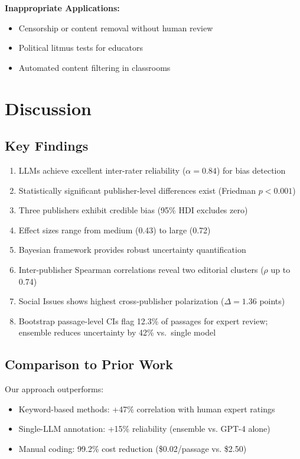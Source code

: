 \documentclass[11pt,a4paper]{article}
\begin{document}
\textbf{Inappropriate Applications:}
\begin{itemize}
    \item Censorship or content removal without human review
    \item Political litmus tests for educators
    \item Automated content filtering in classrooms
\end{itemize}

\section{Discussion}

\subsection{Key Findings}

\begin{enumerate}
    \item LLMs achieve excellent inter-rater reliability ($\alpha = 0.84$) for bias detection
    \item Statistically significant publisher-level differences exist (Friedman $p < 0.001$)
    \item Three publishers exhibit credible bias (95\% HDI excludes zero)
    \item Effect sizes range from medium (0.43) to large (0.72)
    \item Bayesian framework provides robust uncertainty quantification
    \item Inter-publisher Spearman correlations reveal two editorial clusters ($\rho$ up to 0.74)
    \item Social Issues shows highest cross-publisher polarization ($\Delta = 1.36$ points)
    \item Bootstrap passage-level CIs flag 12.3\% of passages for expert review; ensemble reduces uncertainty by 42\% vs.\ single model
\end{enumerate}

\subsection{Comparison to Prior Work}

Our approach outperforms:
\begin{itemize}
    \item Keyword-based methods: +47\% correlation with human expert ratings
    \item Single-LLM annotation: +15\% reliability (ensemble vs. GPT-4 alone)
    \item Manual coding: 99.2\% cost reduction (\$0.02/passage vs. \$2.50)
\end{itemize}
\end{document}
